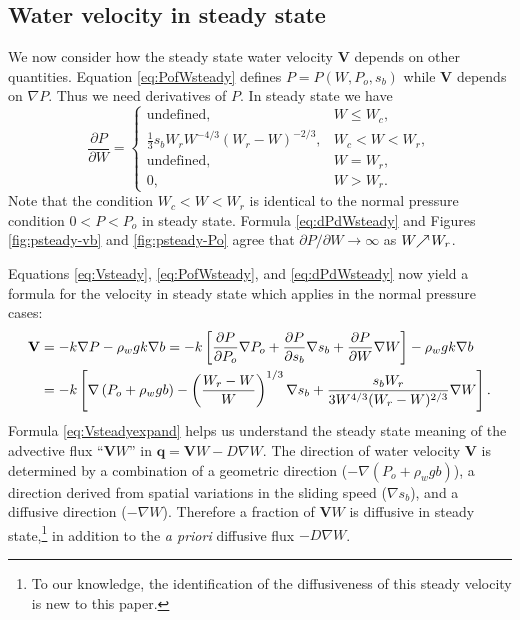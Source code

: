 \documentclass[11pt,final]{amsart}
\newcommand\bV{\mathbf{V}}
\newcommand\bq{\mathbf{q}}
\newcommand{\grad}{\nabla}
\begin{document}
\subsection*{Water velocity in steady state}  We now consider how the steady state water velocity $\bV$ depends on other quantities.  Equation \eqref{eq:PofWsteady} defines $P=P(W,P_o,s_b)$ while $\bV$ depends on $\grad P$.  Thus we need derivatives of $P$.  In steady state we have
\begin{equation}
\frac{\partial P}{\partial W} =
    \begin{cases}
      \text{undefined}, & W \le W_c, \\
      \frac{1}{3} s_b W_r W^{-4/3} (W_r - W)^{-2/3}, & W_c < W < W_r, \\
      \text{undefined}, & W = W_r, \\
      0, & W > W_r.
    \end{cases}  \label{eq:dPdWsteady}
\end{equation}
Note that the condition $W_c < W < W_r$ is identical to the normal pressure condition $0 < P < P_o$ in steady state.  Formula \eqref{eq:dPdWsteady} and Figures \ref{fig:psteady-vb} and \ref{fig:psteady-Po} agree that $\partial P / \partial W \to \infty$ as $W \!\!\nearrow\! W_r$.  

Equations \eqref{eq:Vsteady}, \eqref{eq:PofWsteady}, and \eqref{eq:dPdWsteady} now yield a formula for the velocity in steady state which applies in the normal pressure cases:
\begin{align}
\bV &= - k \grad P - \rho_w g k \grad b = - k \left[\frac{\partial P}{\partial P_o} \grad P_o + \frac{\partial P}{\partial s_b} \grad s_b + \frac{\partial P}{\partial W} \grad W\right] - \rho_w g k \grad b  \notag \\
    &= - k \left[\grad \left(P_o + \rho_w g b\right) - \left(\frac{W_r - W}{W}\right)^{1/3} \grad s_b + \frac{s_b W_r}{3 W^{4/3} (W_r - W)^{2/3}} \grad W\right]. \label{eq:Vsteadyexpand}
\end{align}
Formula \eqref{eq:Vsteadyexpand} helps us understand the steady state meaning of the advective flux ``$\bV W$'' in $\bq=\bV W - D \grad W$.  The direction of water velocity $\bV$ is determined by a combination of a geometric direction ($-\grad \left(P_o + \rho_w g b\right)$), a direction derived from spatial variations in the sliding speed ($\grad s_b$), and a diffusive direction ($-\grad W$).  Therefore a fraction of $\bV W$ is diffusive in steady state,\footnote{To our knowledge, the identification of the diffusiveness of this steady velocity is new to this paper.} in addition to the \emph{a priori} diffusive flux $- D \grad W$.
\end{document}
